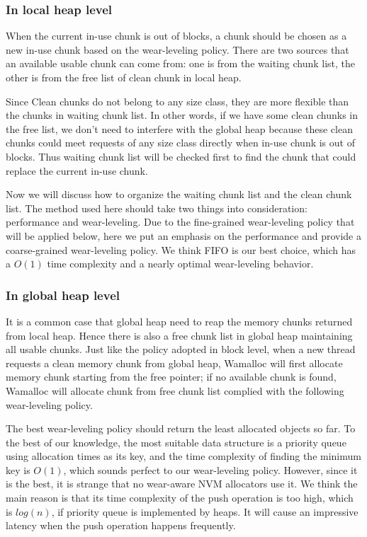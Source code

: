 \documentclass[10pt, conference, compsocconf]{IEEEtran}
\begin{document}
\subsubsection{In local heap level}

When the current in-use chunk is out of blocks, 
a chunk should be chosen as a new in-use chunk based on the wear-leveling policy.
There are two sources that an available usable chunk can come from:
one is from the waiting chunk list, the other is from the free list of clean chunk in local heap.

Since Clean chunks do not belong to any size class, they are more flexible than the chunks in waiting chunk list.
In other words, if we have some clean chunks in the free list, 
we don't need to interfere with the global heap
because these clean chunks could meet requests of any size class directly when in-use chunk is out of blocks.
Thus waiting chunk list will be checked first to find the chunk that could replace the current in-use chunk.

Now we will discuss how to organize the waiting chunk list and the clean chunk list.
The method used here should take two things into consideration:
performance and wear-leveling.
Due to the fine-grained wear-leveling policy that will be applied below,
here we put an emphasis on the performance and provide a coarse-grained wear-leveling policy.
We think FIFO is our best choice, which has a $O(1)$ time complexity and a nearly optimal wear-leveling behavior.

\subsubsection{In global heap level}
It is a common case that global heap need to reap the memory chunks returned from local heap.
Hence there is also a free chunk list in global heap maintaining all usable chunks. 
Just like the policy adopted in block level, 
when a new thread requests a clean memory chunk from global heap,
Wamalloc will first allocate memory chunk starting from the free pointer; 
if no available chunk is found, Wamalloc will allocate chunk from free chunk list complied with the following wear-leveling policy.

The best wear-leveling policy should return the least allocated objects so far. 
To the best of our knowledge, the most suitable data structure is a priority queue using allocation times as its key,
and the time complexity of finding the minimum key is $O(1)$, which sounds perfect to our wear-leveling policy.
However, since it is the best, it is strange that no wear-aware NVM allocators use it.
We think the main reason is that its time complexity of the push operation is too high, 
which is $log(n)$, if priority queue is implemented by heaps. 
It will cause an impressive latency when the push operation happens frequently.
\end{document}
